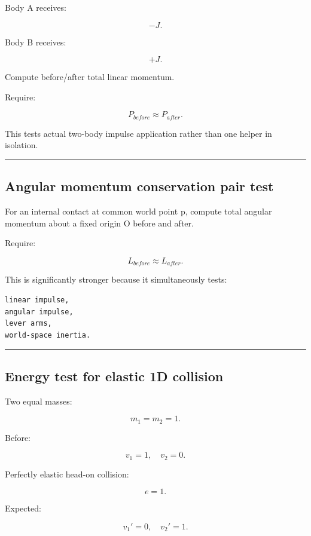 Body A receives:

\[
-J.
\]

Body B receives:

\[
+J.
\]

Compute before/after total linear momentum.

Require:

\[
\boxed{
P_{before}\approx P_{after}.
}
\]

This tests actual two-body impulse application rather than one helper in isolation.

\begin{center}\rule{0.5\linewidth}{0.5pt}\end{center}

\subsection{Angular momentum conservation pair test}\label{06-engine-ii-ch039-angular-momentum-conservation-pair-test}

For an internal contact at common world point p, compute total angular momentum about a fixed origin O before and after.

Require:

\[
L_{before}\approx L_{after}.
\]

This is significantly stronger because it simultaneously tests:

\begin{verbatim}
linear impulse,
angular impulse,
lever arms,
world-space inertia.
\end{verbatim}

\begin{center}\rule{0.5\linewidth}{0.5pt}\end{center}

\subsection{Energy test for elastic 1D collision}\label{06-engine-ii-ch039-energy-test-for-elastic-1d-collision}

Two equal masses:

\[
m_1=m_2=1.
\]

Before:

\[
v_1=1,\quad v_2=0.
\]

Perfectly elastic head-on collision:

\[
e=1.
\]

Expected:

\[
v_1'=0,
\quad
v_2'=1.
\]

